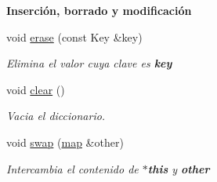\begin{Indent}{\bf Inserción, borrado y modificación}
\begin{DoxyCompactItemize}
void \hyperlink{classaed2_1_1map_a2ffadb42cd5f0bc7b3752ff159b75334_a2ffadb42cd5f0bc7b3752ff159b75334}{erase} (const Key \&key)
\begin{DoxyCompactList}\small\item\em Elimina el valor cuya clave es {\bfseries key} \end{DoxyCompactList}\item 
void \hyperlink{classaed2_1_1map_a2bfa5165825979bf2431db55bc6bc9ca_a2bfa5165825979bf2431db55bc6bc9ca}{clear} ()
\begin{DoxyCompactList}\small\item\em Vacia el diccionario. \end{DoxyCompactList}\item 
void \hyperlink{classaed2_1_1map_a43ddb71cc91e5c6021a7a1f243d6cc4a_a43ddb71cc91e5c6021a7a1f243d6cc4a}{swap} (\hyperlink{classaed2_1_1map}{map} \&other)
\begin{DoxyCompactList}\small\item\em Intercambia el contenido de {\bfseries $\ast$this} y {\bfseries other} \end{DoxyCompactList}\end{DoxyCompactItemize}
\end{Indent}
